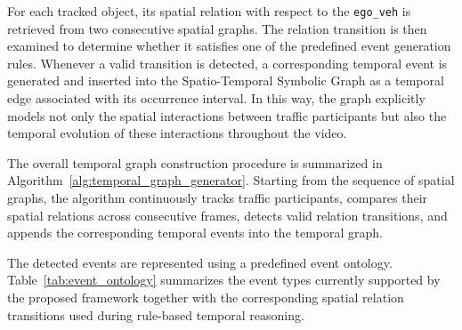 \documentclass[a4paper, 11pt]{article} %
\begin{document}
For each tracked object, its spatial relation with respect to the \texttt{ego\_veh} is retrieved from two consecutive spatial graphs. The relation transition is then examined to determine whether it satisfies one of the predefined event generation rules. Whenever a valid transition is detected, a corresponding temporal event is generated and inserted into the Spatio-Temporal Symbolic Graph as a temporal edge associated with its occurrence interval. In this way, the graph explicitly models not only the spatial interactions between traffic participants but also the temporal evolution of these interactions throughout the video.

The overall temporal graph construction procedure is summarized in Algorithm~\ref{alg:temporal_graph_generator}. Starting from the sequence of spatial graphs, the algorithm continuously tracks traffic participants, compares their spatial relations across consecutive frames, detects valid relation transitions, and appends the corresponding temporal events into the temporal graph.

The detected events are represented using a predefined event ontology. Table~\ref{tab:event_ontology} summarizes the event types currently supported by the proposed framework together with the corresponding spatial relation transitions used during rule-based temporal reasoning.
\end{document}
